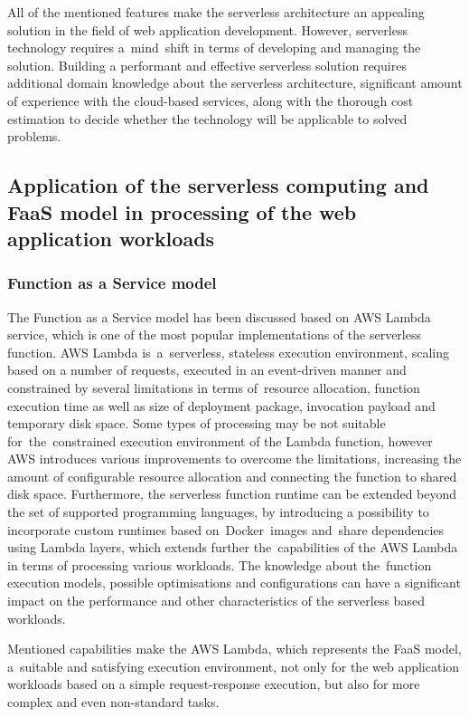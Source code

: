 All of the mentioned features make the serverless architecture an appealing solution in the field of web application development. However, serverless technology requires a~mind~shift in terms of developing and managing the solution.
Building a performant and effective serverless solution requires additional domain knowledge about the serverless architecture, significant amount of experience with the cloud-based services, along with the thorough cost estimation to decide whether the technology will be applicable to solved problems.

\subsection{Application of the serverless computing and FaaS model in processing of the web application workloads}

\subsubsection{Function as a Service model}

The Function as a Service model has been discussed based on AWS Lambda service, which is one of the most popular implementations of the serverless function. 
AWS Lambda is~a~serverless, stateless execution environment, scaling based on a number of requests, executed in an event-driven manner and constrained by several limitations in terms of~resource allocation, function execution time as well as size of deployment package, invocation payload and temporary disk space.
Some types of processing may be not suitable for~the~constrained execution environment of the Lambda function, however AWS introduces various improvements to overcome the limitations, increasing the amount of configurable resource allocation and connecting the function to shared disk space.
Furthermore, the serverless function runtime can be extended beyond the set of supported programming languages, by introducing a possibility to incorporate custom runtimes based on~Docker~images and~share dependencies using Lambda layers, which extends further the~capabilities of the AWS Lambda in terms of processing various workloads.
The knowledge about the~function execution models, possible optimisations and configurations can have a significant impact on the performance and other characteristics of the serverless based workloads.

Mentioned capabilities make the AWS Lambda, which represents the FaaS model, a~suitable and satisfying execution environment, not only for the web application workloads based on a simple request-response execution, but also for more complex and even non-standard tasks.

